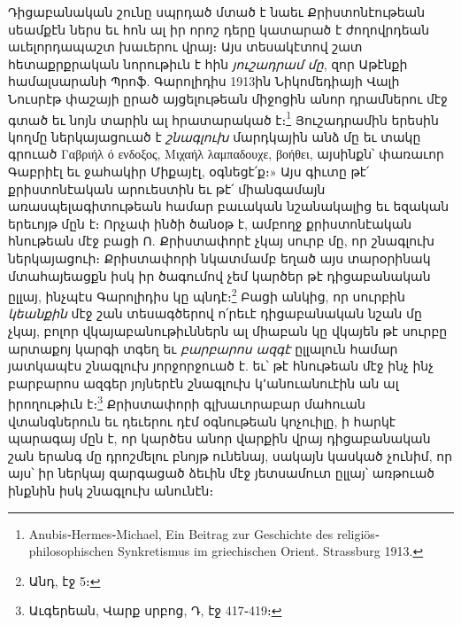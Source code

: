 \documentclass{article}
\begin{document}
{Դիցաբանական շունը սպրդած մտած է նաեւ Քրիստոնէութեան սեամքէն ներս եւ հոն ալ իր որոշ դերը կատարած է ժողովրդեան աւելորդապաշտ խաւերու վրայ։ Այս տեսակէտով շատ հետաքրքրական նորութիւն է հին \emph{յուշադրամ մը}, զոր Աթէնքի համալսարանի Պրոֆ. Գարոլիդիս 1913ին Նիկոմեդիայի Վալի Նուսրէթ փաշայի ըրած այցելութեան միջոցին անոր դրամներու մէջ գտած եւ նոյն տարին ալ հրատարակած է։\footnote{Anubis֊Hermes֊Michael, Ein Beitrag zur Geschichte des religiös֊philosophischen Synkretismus im griechischen Orient. Strassburg 1913.} Յուշադրամին երեսին կողմը ներկայացուած է \emph{շնագլուխ} մարդկային անձ մը եւ տակը գրուած Γαβριήλ ό ενδοξος, Μιχαήλ λαμπαδουχε, βοήθει, այսինքն՝ փառաւոր Գաբրիէլ եւ ջահակիր Միքայէլ, օգնեցէ՛ք։» Այս գիւտը թէ՛ քրիստոնէական արուեստին եւ թէ՛ միանգամայն առասպելագիտութեան համար բաւական նշանակալից եւ եզական երեւոյթ մըն է։ Որչափ ինծի ծանօթ է, ամբողջ քրիստոնէական հնութեան մէջ բացի Ո. Քրիստափորէ չկայ սուրբ մը, որ շնագլուխ ներկայացուի։ Քրիստափորի նկատմամբ եղած այս տարօրինակ մտահայեացքն իսկ իր ծագումով չեմ կարծեր թէ դիցաբանական ըլլայ, ինչպէս Գարոլիդիս կը պնդէ։\footnote{Անդ, էջ 5։} Բացի անկից, որ սուրբին \emph{կեանքին} մէջ շան տեսագծերով ո՛րեւէ դիցաբանական նշան մը չկայ, բոլոր վկայաբանութիւններն ալ միաբան կը վկայեն թէ սուրբը արտաքոյ կարգի տգեղ եւ \emph{բարբարոս ազգէ} ըլլալուն համար յատկապէս շնագլուխ յորջորջուած է. եւ՝ թէ հնութեան մէջ ինչ ինչ բարբարոս ազգեր յոյներէն շնագլուխ կ՚անուանուէին ան ալ իրողութիւն է։\footnote{Աւգերեան, Վարք սրբոց, Դ, էջ 417֊419։} Քրիստափորի գլխաւորաբար մահուան վտանգներուն եւ դեւերու դէմ օգնութեան կոչուիլը, ի հարկէ պարագայ մըն է, որ կարծես անոր վարքին վրայ դիցաբանական շան երանգ մը դրոշմելու բնոյթ ունենայ, սակայն կասկած չունիմ, որ այս՝ իր ներկայ զարգացած ձեւին մէջ յետսամուտ ըլլայ՝ առթուած ինքնին իսկ շնագլուխ անունէն։

}
\end{document}
